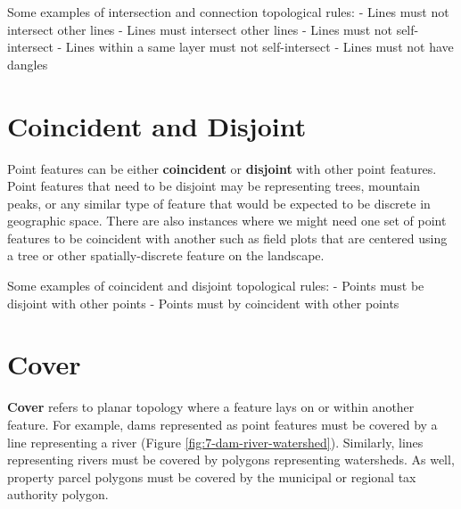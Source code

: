 \documentclass[
]{book}
\begin{document}
Some examples of intersection and connection topological rules:
- Lines must not intersect other lines
- Lines must intersect other lines
- Lines must not self-intersect
- Lines within a same layer must not self-intersect
- Lines must not have dangles

\hypertarget{coincident-and-disjoint}{%
\section{Coincident and Disjoint}\label{coincident-and-disjoint}}

Point features can be either \textbf{coincident} or \textbf{disjoint} with other point features. Point features that need to be disjoint may be representing trees, mountain peaks, or any similar type of feature that would be expected to be discrete in geographic space. There are also instances where we might need one set of point features to be coincident with another such as field plots that are centered using a tree or other spatially-discrete feature on the landscape.

Some examples of coincident and disjoint topological rules:
- Points must be disjoint with other points
- Points must by coincident with other points

\hypertarget{cover}{%
\section{Cover}\label{cover}}

\textbf{Cover} refers to planar topology where a feature lays on or within another feature. For example, dams represented as point features must be covered by a line representing a river (Figure \ref{fig:7-dam-river-watershed}). Similarly, lines representing rivers must be covered by polygons representing watersheds. As well, property parcel polygons must be covered by the municipal or regional tax authority polygon.
\end{document}
